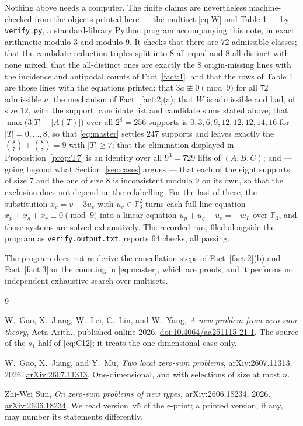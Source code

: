 \documentclass[11pt]{amsart}
\newcommand{\FF}{\mathbb F}
\begin{document}
Nothing above needs a computer. The finite claims are nevertheless
machine-checked from the objects printed here --- the multiset \eqref{eq:W} and
Table 1 --- by \texttt{verify.py}, a standard-library Python program accompanying
this note, in exact arithmetic modulo $3$ and modulo $9$. It checks that there
are $72$ admissible classes; that the candidate reduction-triples split into $8$
all-equal and $8$ all-distinct with none mixed, that the all-distinct ones are
exactly the $8$ origin-missing lines with the incidence and antipodal counts of
Fact~\ref{fact:1}, and that the rows of Table 1 are those lines with the
equations printed; that $3a\not\equiv0\pmod9$ for all $72$ admissible $a$, the
mechanism of Fact~\ref{fact:2}(a); that $W$ is admissible and bad, of size $12$,
with the support, candidate list and candidate sums stated above; that
$\max\bigl(3|T|-|A(T)|\bigr)$ over all $2^8=256$ supports is
$0,3,6,9,12,12,12,14,16$ for $|T|=0,\dots,8$, so that \eqref{eq:master} settles
$247$ supports and leaves exactly the $\binom87+\binom88=9$ with $|T|\ge7$; that
the elimination displayed in Proposition~\ref{prop:T7} is an identity over all
$9^3=729$ lifts of $(A,B,C)$; and --- going beyond what
Section~\ref{sec:cases} argues --- that each of the eight supports of size $7$
and the one of size $8$ is inconsistent modulo $9$ on its own, so that the
exclusion does not depend on the relabelling. For the last of these, the
substitution $x_v=v+3u_v$ with $u_v\in\FF_3^2$ turns each full-line equation
$x_p+x_q+x_r\equiv0\pmod9$ into a linear equation $u_p+u_q+u_r=-w_L$ over
$\FF_3$, and those systems are solved exhaustively. The recorded run, filed
alongside the program as \texttt{verify.output.txt}, reports $64$ checks, all
passing.

The program does not re-derive the cancellation steps of Fact~\ref{fact:2}(b)
and Fact~\ref{fact:3} or the counting in \eqref{eq:master}, which are proofs, and
it performs no independent exhaustive search over multisets.

\begin{thebibliography}{9}

W.~Gao, X.~Jiang, W.~Lei, C.~Lin, and W.~Yang,
\emph{A new problem from zero-sum theory},
Acta Arith., published online 2026.
\href{https://doi.org/10.4064/aa251115-21-1}{doi:10.4064/aa251115-21-1}.
The source of the $s_1$ half of \eqref{eq:C12}; it treats the
one-dimensional case only.

W.~Gao, X.~Jiang, and Y.~Mu,
\emph{Two local zero-sum problems},
arXiv:2607.11313, 2026.
\href{https://arxiv.org/abs/2607.11313}{arXiv:2607.11313}.
One-dimensional, and with selections of size at most $n$.

Zhi-Wei Sun,
\emph{On zero-sum problems of new types},
arXiv:2606.18234, 2026.
\href{https://arxiv.org/abs/2606.18234}{arXiv:2606.18234}.
We read version~v5 of the e-print; a printed version, if any, may number its
statements differently.

\end{thebibliography}
\end{document}
